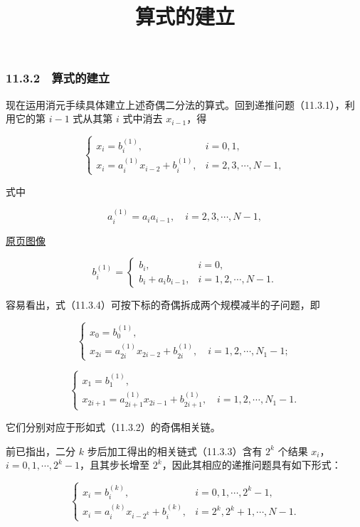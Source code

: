 \documentclass[
  10pt,
  fontset=fandol]{ctexart}
\title{算式的建立}
\author{}
\date{}
\begin{document}
\maketitle

\subsubsection{11.3.2　算式的建立}\label{ux7b97ux5f0fux7684ux5efaux7acb}

现在运用消元手续具体建立上述奇偶二分法的算式。回到递推问题（11.3.1），利用它的第 \(i-1\) 式从其第 \(i\) 式中消去 \(x_{i-1}\)，得

\[
\begin{cases}
x_i=b_i^{(1)},& i=0,1,\\
x_i=a_i^{(1)}x_{i-2}+b_i^{(1)},& i=2,3,\cdots,N-1,
\end{cases}
\tag{11.3.4}
\]

式中

\[
a_i^{(1)}=a_i a_{i-1},\quad i=2,3,\cdots,N-1,
\tag{11.3.5}
\]

\href{../../source-images/pdf-287.jpeg}{原页图像}

\[
b_i^{(1)}=
\begin{cases}
b_i,& i=0,\\
b_i+a_i b_{i-1},& i=1,2,\cdots,N-1.
\end{cases}
\tag{11.3.6}
\]

容易看出，式（11.3.4）可按下标的奇偶拆成两个规模减半的子问题，即

\[
\begin{cases}
x_0=b_0^{(1)},\\
x_{2i}=a_{2i}^{(1)}x_{2i-2}+b_{2i}^{(1)},\quad i=1,2,\cdots,N_1-1;
\end{cases}
\]

\[
\begin{cases}
x_1=b_1^{(1)},\\
x_{2i+1}=a_{2i+1}^{(1)}x_{2i-1}+b_{2i+1}^{(1)},\quad i=1,2,\cdots,N_1-1.
\end{cases}
\]

它们分别对应于形如式（11.3.2）的奇偶相关链。

前已指出，二分 \(k\) 步后加工得出的相关链式（11.3.3）含有 \(2^k\) 个结果 \(x_i\)，\(i=0,1,\cdots,2^k-1\)，且其步长增至 \(2^k\)，因此其相应的递推问题具有如下形式：

\[
\begin{cases}
x_i=b_i^{(k)},& i=0,1,\cdots,2^k-1,\\
x_i=a_i^{(k)}x_{i-2^k}+b_i^{(k)},& i=2^k,2^k+1,\cdots,N-1.
\end{cases}
\tag{11.3.7}
\]
\end{document}
